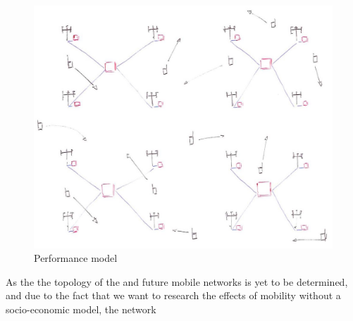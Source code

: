\begin{figure}[tb]
	\centering
	\includegraphics[width=\linewidth]{performance_delay.jpg} 
	\caption{Performance model}
	\label{fig:performance_model}
\end{figure}

As the the topology of the \xcloud and future mobile networks is yet to be determined, and due to the fact that we want to research the effects of mobility without a socio-economic model, the network 

